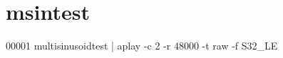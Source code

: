 \hypertarget{msintest_source}{\section{msintest}
\label{msintest_source}
}

\begin{DoxyCode}
00001 multisinusoidtest | aplay -c 2 -r 48000 -t raw -f S32\_LE
\end{DoxyCode}
